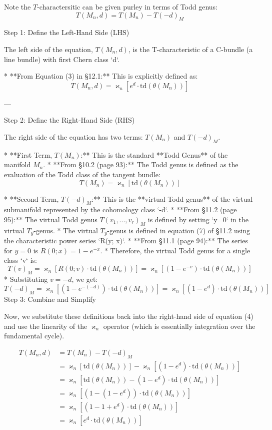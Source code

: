 \documentclass{book}
\begin{document}
Note the $T$-charactersitic can be given purley in terms of Todd genus:
\[
  T(M_n, d) = T(M_n) - T(-d)_M
\]

\begin{Proof}
   Step 1: Define the Left-Hand Side (LHS)

The left side of the equation, \(T(M_n, d)\), is the T-characteristic of a C\*-bundle (a line bundle) with first Chern class `d`.

*   **From Equation (3) in §12.1:** This is explicitly defined as:
    \[ T(M_n, d) = \varkappa_n [e^d \cdot \text{td}(\theta(M_n))] \]

---

 Step 2: Define the Right-Hand Side (RHS)

The right side of the equation has two terms: \(T(M_n)\) and \(T(-d)_M\).

*   **First Term, \(T(M_n)\):** This is the standard **Todd Genus** of the manifold $M_n$.
    *   **From §10.2 (page 93):** The Todd genus is defined as the evaluation of the Todd class of the tangent bundle:
    \[
      T(M_n) = \varkappa_n [\text{td}(\theta(M_n))]
    \]

*   **Second Term, \(T(-d)_M\):** This is the **virtual Todd genus** of the virtual submanifold represented by the cohomology class `-d`.
    *   **From §11.2 (page 95):** The virtual Todd genus $T(v_1, ..., v_r)_M$ is defined by setting `y=0` in the virtual $T_y$-genus.
    *   The virtual $T_y$-genus is defined in equation (7) of §11.2 using the characteristic power series `R(y; x)`.
    *   **From §11.1 (page 94):** The series for $y=0$ is $R(0; x) = 1 - e^{-x}$.
    *   Therefore, the virtual Todd genus for a single class `v` is:
    \[
      T(v)_M = \varkappa_n [R(0; v) \cdot \text{td}(\theta(M_n))] = \varkappa_n [(1 - e^{-v}) \cdot \text{td}(\theta(M_n))]
    \]
    *   Substituting $v = -d$, we get:
    \[
      T(-d)_M = \varkappa_n [(1 - e^{-(-d)}) \cdot \text{td}(\theta(M_n))] = \varkappa_n [(1 - e^d) \cdot \text{td}(\theta(M_n))]
    \]
 Step 3: Combine and Simplify

Now, we substitute these definitions back into the right-hand side of equation (4) and use the linearity of the \(\varkappa_n\) operator (which is essentially integration over the fundamental cycle).

\begin{align*} T(M_n, d) &= T(M_n) - T(-d)_M \\ &= \varkappa_n[\text{td}(\theta(M_n))] - \varkappa_n[(1 - e^d) \cdot \text{td}(\theta(M_n))] \\ &= \varkappa_n[\text{td}(\theta(M_n)) - (1 - e^d) \cdot \text{td}(\theta(M_n))] \\ &= \varkappa_n[\left(1 - (1 - e^d)\right) \cdot \text{td}(\theta(M_n))] \\ &= \varkappa_n[\left(1 - 1 + e^d\right) \cdot \text{td}(\theta(M_n))] \\ &= \varkappa_n[e^d \cdot \text{td}(\theta(M_n))]
\end{align*}


\end{Proof}
\end{document}
